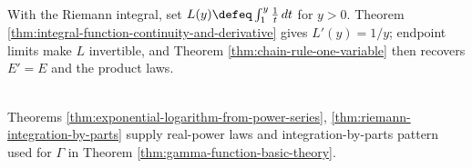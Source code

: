 \begin{perspective} \label{per:ross-logarithmic-integral-route} \\
With the Riemann integral, set $L(y)\defeq\int_1^y \frac1t\,dt$ for $y>0$. Theorem \ref{thm:integral-function-continuity-and-derivative} gives $L'(y)=1/y$; endpoint limits make $L$ invertible, and Theorem \ref{thm:chain-rule-one-variable} then recovers $E'=E$ and the product laws.
\end{perspective}

\begin{perspective} \label{per:exponential-factorial-and-improper-integrals} \\
Theorems \ref{thm:exponential-logarithm-from-power-series}, \ref{thm:riemann-integration-by-parts} supply real-power laws and integration-by-parts pattern used for $\Gamma$ in Theorem \ref{thm:gamma-function-basic-theory}.
\end{perspective}

